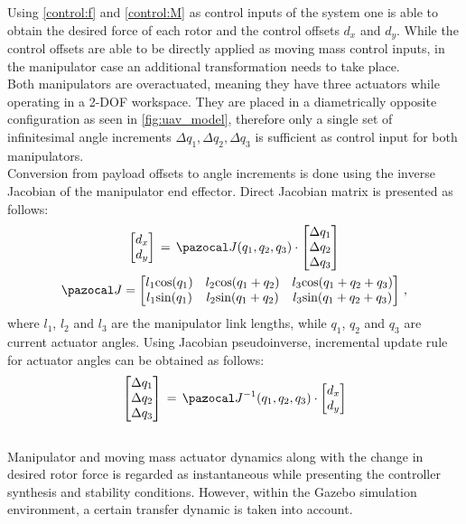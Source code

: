 Using \eqref{control:f} and \eqref{control:M} as control inputs of the system one is able to obtain the desired force of each rotor and the control offsets $d_x$ and $d_y$. While the control offsets are able to be directly applied as moving mass control inputs, in the manipulator case an additional transformation needs to take place. \\
Both manipulators are overactuated, meaning they have three actuators while operating in a 2-DOF workspace. They are placed in a diametrically opposite configuration as seen in \ref{fig:uav_model}, therefore only a single set of infinitesimal angle increments $\Delta q_1, \Delta q_2, \Delta q_3$ is sufficient as control input for both manipulators. \\
Conversion from payload offsets to angle increments is done using the inverse Jacobian of the manipulator end effector. Direct Jacobian matrix is presented as follows:
\begin{gather}
	\begin{bmatrix}
		d_x \\
		d_y
	\end{bmatrix}
	\, = \, 
	\Ja (q_1, q_2, q_3)
	\cdot 
	\begin{bmatrix}
		\Delta q_1 \\
		\Delta q_2 \\
		\Delta q_3
	\end{bmatrix} \\
	\Ja = 
	\begin{bmatrix}
		l_1\text{cos}(q_1) & l_2 \text{cos}(q_1 + q_2) & l_3 \text{cos}(q_1 + q_2 + q_3) \\
		l_1\text{sin}(q_1) & l_2 \text{sin}(q_1 + q_2) & l_3 \text{sin}(q_1 + q_2 + q_3) 
	\end{bmatrix} \, ,
\end{gather}
where $l_1$, $l_2$ and $l_3$ are the manipulator link lengths, while $q_1$, $q_2$ and $q_3$ are current actuator angles. Using Jacobian pseudoinverse, incremental update rule for actuator angles can be obtained as follows:
\begin{equation}
	\begin{bmatrix}
	\Delta q_1 \\
	\Delta q_2 \\
	\Delta q_3
	\end{bmatrix} 
	\, = \, \Ja^{-1} (q_1, q_2, q_3) \cdot
	\begin{bmatrix}
	d_x \\
	d_y
	\end{bmatrix}
\end{equation}
\\
Manipulator and moving mass actuator dynamics along with the change in desired rotor force is regarded as instantaneous while presenting the controller synthesis and stability conditions. However, within the Gazebo simulation environment, a certain transfer dynamic is taken into  account.